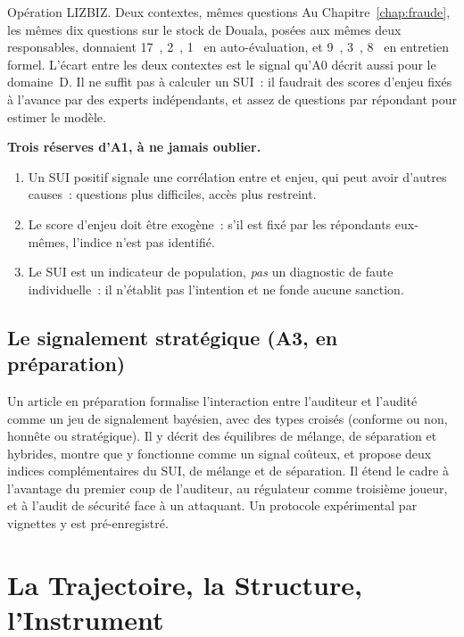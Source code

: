 \begin{boxscenario}{Opération LIZBIZ. Deux contextes, mêmes questions}
Au Chapitre~\ref{chap:fraude}, les mêmes dix questions sur le stock de
Douala, posées aux mêmes deux responsables, donnaient 17~\OUI{}, 2~\NON{},
1~\NEK{} en auto-évaluation, et 9~\OUI{}, 3~\NON{}, 8~\NEK{} en entretien
formel. L'écart entre les deux contextes est le signal qu'A0 décrit aussi
pour le domaine~D. Il ne suffit pas à calculer un SUI~: il faudrait des
scores d'enjeu fixés à l'avance par des experts indépendants, et assez de
questions par répondant pour estimer le modèle.
\end{boxscenario}

\begin{boxalert}
\textbf{Trois réserves d'A1, à ne jamais oublier.}
\begin{enumerate}
    \item Un SUI positif signale une corrélation entre \NEK{} et enjeu, qui
          peut avoir d'autres causes~: questions plus difficiles, accès plus
          restreint.
    \item Le score d'enjeu doit être exogène~: s'il est fixé par les
          répondants eux-mêmes, l'indice n'est pas identifié.
    \item Le SUI est un indicateur de population, \emph{pas} un diagnostic
          de faute individuelle~: il n'établit pas l'intention et ne fonde
          aucune sanction.
\end{enumerate}
\end{boxalert}

\subsection{Le signalement stratégique (A3, en préparation)}

Un article en préparation formalise l'interaction entre l'auditeur et
l'audité comme un jeu de signalement bayésien, avec des types croisés
(conforme ou non, honnête ou stratégique). Il y décrit des équilibres de
mélange, de séparation et hybrides, montre que \NEK{} y fonctionne comme un
signal coûteux, et propose deux indices complémentaires du SUI, de mélange
et de séparation. Il étend le cadre à l'avantage du premier coup de
l'auditeur, au régulateur comme troisième joueur, et à l'audit de sécurité
face à un attaquant. Un protocole expérimental par vignettes y est
pré-enregistré.

\section{La Trajectoire, la Structure, l'Instrument}
\label{sec:c22-travaux}

